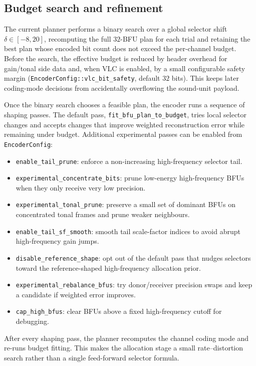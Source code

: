 \documentclass[11pt]{article}
\begin{document}
\subsection{Budget search and refinement}

The current planner performs a binary search over a global selector shift
\(\delta \in [-8,20]\), recomputing the full \(32\)-BFU plan for each trial
and retaining the best plan whose encoded bit count does not exceed the
per-channel budget. Before the search, the effective budget is reduced by
header overhead for gain/tonal side data and, when VLC is enabled, by a small
configurable safety margin (\texttt{EncoderConfig::vlc\_bit\_safety}, default
\(32\) bits). This keeps later coding-mode decisions from accidentally
overflowing the sound-unit payload.

Once the binary search chooses a feasible plan, the encoder runs a sequence
of shaping passes. The default pass, \texttt{fit\_bfu\_plan\_to\_budget},
tries local selector changes and accepts changes that improve weighted
reconstruction error while remaining under budget. Additional experimental
passes can be enabled from \texttt{EncoderConfig}:

\begin{itemize}
\itemsep0pt
\item \texttt{enable\_tail\_prune}: enforce a non-increasing
high-frequency selector tail.
\item \texttt{experimental\_concentrate\_bits}: prune low-energy
high-frequency BFUs when they only receive very low precision.
\item \texttt{experimental\_tonal\_prune}: preserve a small set of
dominant BFUs on concentrated tonal frames and prune weaker neighbours.
\item \texttt{enable\_tail\_sf\_smooth}: smooth tail scale-factor
indices to avoid abrupt high-frequency gain jumps.
\item \texttt{disable\_reference\_shape}: opt out of the default pass
that nudges selectors toward the reference-shaped high-frequency allocation
prior.
\item \texttt{experimental\_rebalance\_bfus}: try donor/receiver
precision swaps and keep a candidate if weighted error improves.
\item \texttt{cap\_high\_bfus}: clear BFUs above a fixed high-frequency
cutoff for debugging.
\end{itemize}

\noindent
After every shaping pass, the planner recomputes the channel coding mode and
re-runs budget fitting. This makes the allocation stage a small
rate--distortion search rather than a single feed-forward selector formula.
\end{document}
